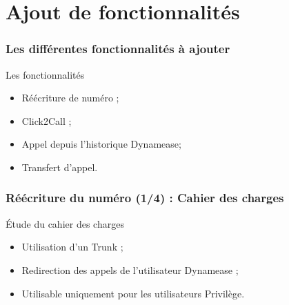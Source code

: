 \section{Ajout de fonctionnalités}
\author{Kévin Moreau}


\begin{frame}
	\frametitle{Les différentes fonctionnalités à ajouter}

	\begin{block}{Les fonctionnalités}
	 \begin{itemize}
      \item Réécriture de numéro ;
	  \item Click2Call ;
	  \item Appel depuis l'historique Dynamease;
	  \item Transfert d'appel.
	 \end{itemize}
	\end{block}
\end{frame}

\begin{frame}
	\frametitle{Réécriture du numéro (1/4) : Cahier des charges}

	\begin{block}{Étude du cahier des charges}
	 \begin{itemize}
      \item Utilisation d'un Trunk ;
      \item Redirection des appels de l'utilisateur Dynamease ;
      \item Utilisable uniquement pour les utilisateurs Privilège.
	 \end{itemize}
	\end{block}
\end{frame}

